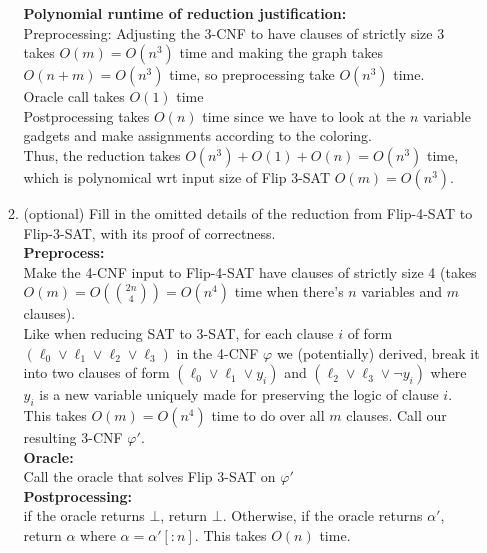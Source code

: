 \documentclass[11pt]{article}
\begin{document}
\begin{enumerate}
\begin{enumerate}
        \textbf{Polynomial runtime of reduction justification:} \\
        
        Preprocessing: Adjusting the 3-CNF to have clauses of strictly size 3 takes $O(m) = O(n^3)$ time and making the graph takes $O(n+m) = O(n^3)$ time, so preprocessing take $O(n^3)$ time. \\
        Oracle call takes $O(1)$ time \\
        Postprocessing takes $O(n)$ time since we have to look at the $n$ variable gadgets and make assignments according to the coloring. \\

        Thus, the reduction takes $O(n^3) + O(1) + O(n) = O(n^3)$ time, which is polynomical wrt input size of Flip 3-SAT $O(m) = O(n^3)$. \\

        \item (optional) Fill in the omitted details of the reduction from Flip-4-SAT to Flip-3-SAT, with its proof of correctness. \\

        \textbf{Preprocess:} \\
        
        Make the 4-CNF input to Flip-4-SAT have clauses of strictly size 4 (takes $O(m) = O(\binom{2n}{4}) = O(n^4)$ time when there's $n$ variables and $m$ clauses). \\

        Like when reducing SAT to 3-SAT, for each clause $i$ of form $(\ell_0 \vee \ell_1 \vee \ell_2 \vee \ell_3)$ in the 4-CNF $\varphi$ we (potentially) derived, break it into two clauses of form $(\ell_0 \vee \ell_1 \vee y_i)$ and $(\ell_2 \vee \ell_3 \vee \neg y_i)$ where $y_i$ is a new variable uniquely made for preserving the logic of clause $i$. This takes $O(m) = O(n^4)$ time to do over all $m$ clauses. Call our resulting 3-CNF $\varphi'$. \\

        \textbf{Oracle:} \\

        Call the oracle that solves Flip 3-SAT on $\varphi'$ \\

        \textbf{Postprocessing:} \\

        if the oracle returns $\bot$, return $\bot$. Otherwise, if the oracle returns $\alpha'$, return $\alpha$ where $\alpha = \alpha'[:n]$. This takes $O(n)$ time. \\


\end{enumerate}
\end{enumerate}
\end{document}
